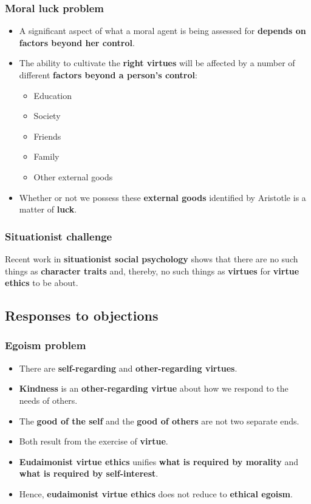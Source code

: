 \documentclass[11pt]{article}
\begin{document}
\subsubsection{Moral luck problem}
\label{sec:org5282555}
\begin{itemize}
\item A significant aspect of what a moral agent is being assessed for \textbf{depends on factors beyond her control}.
\item The ability to cultivate the \textbf{right virtues} will be affected by a number of different \textbf{factors beyond a person's control}:
\begin{itemize}
\item Education
\item Society
\item Friends
\item Family
\item Other external goods
\end{itemize}
\item Whether or not we possess these \textbf{external goods} identified by Aristotle is a matter of \textbf{luck}.
\end{itemize}
\subsubsection{Situationist challenge}
\label{sec:org0cf47de}
Recent work in \textbf{situationist social psychology} shows that there are no such things as \textbf{character traits} and, thereby, no such things as \textbf{virtues} for \textbf{virtue ethics} to be about.
\subsection{Responses to objections}
\label{sec:org8876baf}

\subsubsection{Egoism problem}
\label{sec:org5051430}
\begin{itemize}
\item There are \textbf{self-regarding} and \textbf{other-regarding virtues}.
\item \textbf{Kindness} is an \textbf{other-regarding virtue} about how we respond to the needs of others.
\item The \textbf{good of the self} and the \textbf{good of others} are not two separate ends.
\item Both result from the exercise of \textbf{virtue}.
\item \textbf{Eudaimonist virtue ethics} unifies \textbf{what is required by morality} and \textbf{what is required by self-interest}.
\item Hence, \textbf{eudaimonist virtue ethics} does not reduce to \textbf{ethical egoism}.
\end{itemize}
\end{document}

